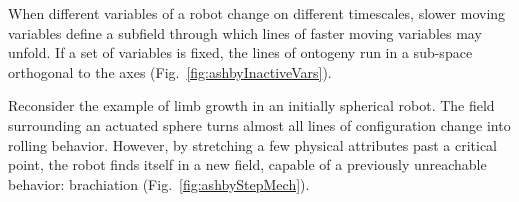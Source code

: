 \begin{enumerate}
    When different variables of a robot change on different timescales, slower moving variables define a subfield through which lines of faster moving variables may unfold.
    If a set of variables is fixed, the lines of ontogeny run in a sub-space orthogonal to the axes (Fig.~\ref{fig:ashbyInactiveVars}).
    
    Reconsider the example of limb growth in an initially spherical robot.
    The field 
    surrounding 
    an actuated sphere turns almost all lines of configuration change into rolling behavior.
    However, by stretching a few physical attributes past a critical point,
    the robot finds itself in a new field, capable of a previously unreachable behavior: brachiation (Fig.~\ref{fig:ashbyStepMech}).
    
    
    
 
    
    
    
    
    


\end{enumerate}


